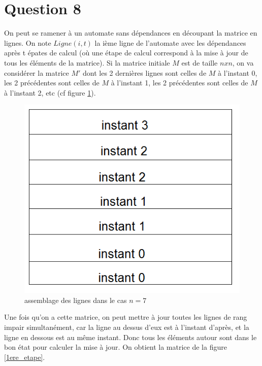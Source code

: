 \documentclass[a4paper,11pt]{article}
\begin{document}
\section*{Question 8}
On peut se ramener à un automate sans dépendances en découpant la matrice en lignes. On note $Ligne(i,t)$ la ième ligne de l'automate avec les dépendances après t épates de calcul (où une étape de calcul correspond à la mise à jour de tous les éléments de la matrice). Si la matrice initiale $M$ est de taille $nxn$, on va considérer la matrice $M'$ dont les 2 dernières lignes sont celles de $M$ à l'instant 0, les 2 précédentes sont celles de $M$ à l'instant 1, les 2 précédentes sont celles de $M$ à l'instant 2, etc (cf figure \ref{decoupage}).\\

\begin{figure}[!h]
\begin{center}
\includegraphics[scale=0.5]{decoupage.png}
\caption{assemblage des lignes dans le cas $n=7$}
\end{center}
\label{decoupage}
\end{figure}

Une fois qu'on a cette matrice, on peut mettre à jour toutes les lignes de rang impair simultanément, car la ligne au dessus d'eux est à l'instant d'après, et la ligne en dessous est au même instant. Donc tous les éléments autour sont dans le bon état pour calculer la mise à jour. On obtient la matrice de la figure \ref{1ere_etape}. \\
\end{document}
